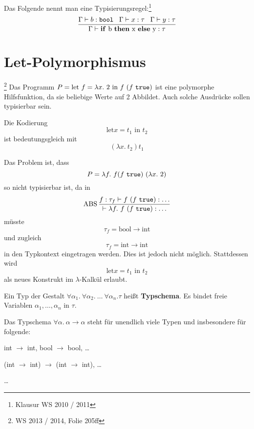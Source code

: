 \begin{beispiel}[Typisierungsregel]%
	Das Folgende nennt man eine Typisierungsregel:\footnote{Klausur WS 2010 / 2011}
	\[\frac{\Gamma \vdash b: \text{\texttt{bool}}\;\;\; \Gamma \vdash x: \tau \;\;\; \Gamma \vdash y: \tau }{\Gamma \vdash \text{\textbf{if} b \textbf{then} x \textbf{else} y} : \tau}\]
\end{beispiel}

\section{Let-Polymorphismus}\footnote{WS 2013 / 2014, Folie 205ff}%
Das Programm $P = \text{let } f = \lambda x.\ 2 \text{ in } f\ (f\ \text{\texttt{true}})$
ist eine polymorphe Hilfsfunktion, da sie beliebige Werte auf 2 Abbildet.
Auch solche Ausdrücke sollen typisierbar sein.

Die Kodierung 
\[\text{let} x = t_1 \text{ in } t_2\]
ist bedeutungsgleich mit
\[(\lambda x.\ t_2) t_1\]

Das Problem ist, dass 
\[P = \lambda f. \ f (f\ \text{\texttt{true}})\ (\lambda x.\ 2)\]
so nicht typisierbar ist, da in
\[\ABS \frac{f: \tau_f \vdash f\ (f\ \text{\texttt{true}}): \dots}{\vdash \lambda f.\ f\ (f\ \text{\texttt{true}}): \dots}\]
müsste 
\[\tau_f = \text{bool} \rightarrow \text{int}\]
und zugleich
\[\tau_f = \text{int} \rightarrow \text{int}\]
in den Typkontext eingetragen werden. Dies ist jedoch nicht möglich. Stattdessen
wird 
\[\text{let} x = t_1 \text{ in } t_2\]
als neues Konstrukt im $\lambda$-Kalkül erlaubt.

\begin{definition}[Typschema]%
    Ein Typ der Gestalt $\forall \alpha_1.\ \forall \alpha_2.\ \dots\ \forall \alpha_n. \tau$
    heißt \textbf{Typschema}. Es bindet freie Variablen $\alpha_1, \dots, \alpha_n$
    in $\tau$.
\end{definition}

\begin{beispiel}[Typschema]
    Das Typschema $\forall \alpha.\ \alpha \rightarrow \alpha$ steht für unendlich
    viele Typen und insbesondere für folgende:
    \begin{bspenum}
        \item int $\rightarrow$ int, bool $\rightarrow$ bool, \dots
        \item (int $\rightarrow$ int) $\rightarrow$ (int $\rightarrow$ int), \dots
        \item \dots
    \end{bspenum}
\end{beispiel}

